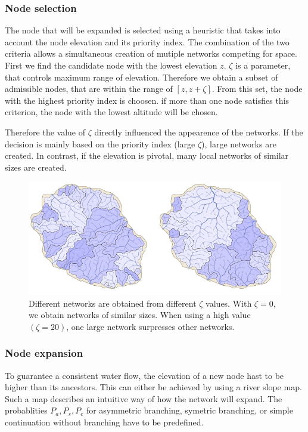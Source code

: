 \subsubsection{Node selection}
The node that will be expanded is selected using a heuristic that takes into account the node elevation and its priority index. The combination of the two criteria allows a simultaneous creation of mutiple networks competing for space. 
First we find the candidate node with the lowest elevation $z$. 
$\zeta $ is a parameter, that controls maximum range of elevation. Therefore we obtain a subset of admissible nodes, that are within the range of $[z, z + \zeta]$. From this set, the node with the highest priority index is choosen. if more than one node satisfies this criterion, the node with the lowest altitude will be chosen. 

Therefore the value of $\zeta$ directly influenced the appearence of the networks. If the decision is mainly based on the priority index (large $\zeta$), large networks are created. In contrast, if the elevation is pivotal, many local networks of similar sizes are created.

\begin{figure}[htb]
	\centering
	\includegraphics[width=\linewidth]{GGG13/drainage_system}
	\caption{Different networks are obtained from different $\zeta$ values. With $\zeta = 0$, we obtain networks of similar sizes. When using a high value $(\zeta = 20)$, one large network surpresses other networks. }
	\label{fig:river_network_sketch}
\end{figure}

\subsubsection{Node expansion}
To guarantee a consistent water flow, the elevation of a new node hast to be higher than its ancestors. This can either be achieved by using a river slope map. Such a map describes an intuitive way of how the network will expand. The probablities $P_a, P_s, P_c$ for asymmetric branching, symetric branching, or simple continuation without branching have to be predefined. 

